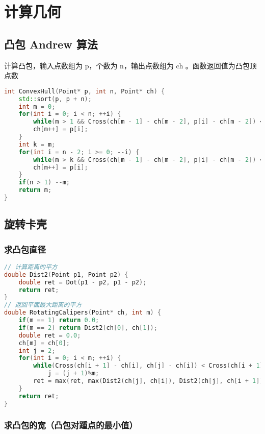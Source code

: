 

\section{计算几何}

\subsection{凸包 Andrew 算法}

计算凸包，输入点数组为 p，个数为 n，输出点数组为 ch 。函数返回值为凸包顶点数

\begin{lstlisting}[language=C++]
int ConvexHull(Point* p, int n, Point* ch) {
    std::sort(p, p + n);
    int m = 0;
    for(int i = 0; i < n; ++i) {
        while(m > 1 && Cross(ch[m - 1] - ch[m - 2], p[i] - ch[m - 2]) < 0) --m;
        ch[m++] = p[i];
    }
    int k = m;
    for(int i = n - 2; i >= 0; --i) {
        while(m > k && Cross(ch[m - 1] - ch[m - 2], p[i] - ch[m - 2]) < 0) --m;
        ch[m++] = p[i];
    }
    if(n > 1) --m;
    return m;
}
\end{lstlisting}

\subsection{旋转卡壳}

\subsubsection{求凸包直径}

\begin{lstlisting}[language=C++]
// 计算距离的平方
double Dist2(Point p1, Point p2) { 
    double ret = Dot(p1 - p2, p1 - p2);
    return ret;
}
// 返回平面最大距离的平方
double RotatingCalipers(Point* ch, int m) {
    if(m == 1) return 0.0;
    if(m == 2) return Dist2(ch[0], ch[1]);
    double ret = 0.0;
    ch[m] = ch[0];
    int j = 2;
    for(int i = 0; i < m; ++i) {
        while(Cross(ch[i + 1] - ch[i], ch[j] - ch[i]) < Cross(ch[i + 1] - ch[i], ch[j + 1] - ch[i]))
            j = (j + 1)%m;
        ret = max(ret, max(Dist2(ch[j], ch[i]), Dist2(ch[j], ch[i + 1])));
    }
    return ret;
}   
\end{lstlisting}

\subsubsection{求凸包的宽（凸包对踵点的最小值）}

